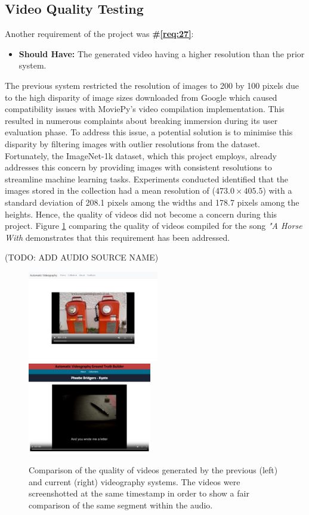 \documentclass{l4proj}
\begin{document}
\subsection{Video Quality Testing}
Another requirement of the project was \textbf{\#\ref{req:27}}:

\begin{itemize}
    \item \textbf{Should Have:} The generated video having a higher resolution than the prior system.
\end{itemize}

The previous system restricted the resolution of images to 200 by 100 pixels due to the high disparity of image sizes downloaded from Google which caused compatibility issues with MoviePy's video compilation implementation. This resulted in numerous complaints about breaking immersion during its user evaluation phase. To address this issue, a potential solution is to minimise this disparity by filtering images with outlier resolutions from the dataset. Fortunately, the ImageNet-1k dataset, which this project employs, already addresses this concern by providing images with consistent resolutions to streamline machine learning tasks. Experiments conducted identified that the images stored in the collection had a mean resolution of ($473.0 \times 405.5$) with a standard deviation of 208.1 pixels among the widths and 178.7 pixels among the heights.
Hence, the quality of videos did not become a concern during this project. Figure \ref{fig:video_quality_comp} comparing the quality of videos compiled for the song \emph{"A Horse With} demonstrates that this requirement has been addressed.

(TODO: ADD AUDIO SOURCE NAME)
\begin{figure}
    \centering
    \includegraphics[width=0.51\textwidth]{figures/kyoto_quality_p.pdf}
    \includegraphics[width=0.48\textwidth]{figures/kyoto_quality_c.pdf}
    \caption{Comparison of the quality of videos generated by the previous (left) and current (right) videography systems. The videos were screenshotted at the same timestamp in order to show a fair comparison of the same segment within the audio.}
    \label{fig:video_quality_comp}
\end{figure}
\end{document}
